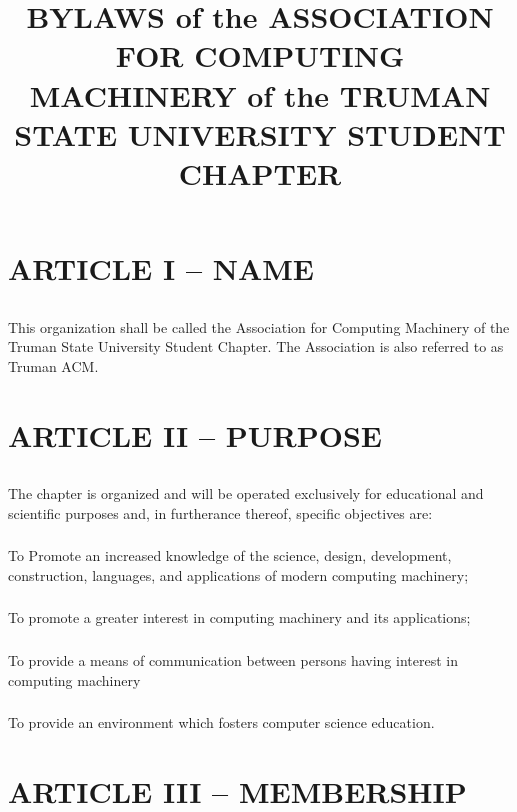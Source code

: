 \documentclass[12pt]{article}
\title{BYLAWS
of the
ASSOCIATION FOR COMPUTING MACHINERY
of the
TRUMAN STATE UNIVERSITY STUDENT CHAPTER}
\begin{document}
	\maketitle
	
	\thispagestyle{empty}
	
		
\section{ARTICLE I – NAME}
\subsection{}	This organization shall be called the Association for Computing Machinery of the Truman State University Student Chapter. The Association is also referred to as Truman ACM.

\section{ARTICLE II – PURPOSE}
\subsection{}	The chapter is organized and will be operated exclusively for educational and scientific purposes and, in furtherance thereof, specific objectives are:
\subsubsection{}	To Promote an increased knowledge of the science, design, development, construction, languages, and applications of modern computing machinery;
\subsubsection{}	To promote a greater interest in computing machinery and its applications;
\subsubsection{}	To provide a means of communication between persons having interest in computing machinery
\subsubsection{}	To provide an environment which fosters computer science education.

\section{ARTICLE III – MEMBERSHIP}
	
\end{document}
